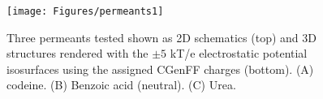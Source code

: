 \begin{figure}[htbp]
\begin{center}
	\texttt{[image: Figures/permeants1]}
	\caption{Three permeants tested shown as 2D schematics (top) and 3D structures rendered with the $\pm 5$ kT/e electrostatic potential isosurfaces 
using the assigned CGenFF charges (bottom).  (A) codeine.  (B) Benzoic acid (neutral).  (C) Urea.}
	\label{fig:permeants}
\end{center}
\end{figure}

